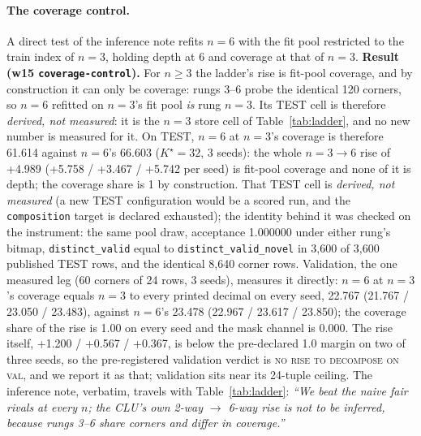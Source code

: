 \documentclass{article} %
\newcommand{\Kstar}{\ensuremath{K^{\star}}}
\begin{document}
\paragraph{The coverage control.} A direct test of the inference note refits $n=6$ with the
fit pool restricted to the train index of $n=3$, holding depth at 6 and coverage at that of $n=3$.
\textbf{Result (w15 \texttt{coverage-control}).} For $n\ge3$ the ladder's rise is fit-pool
coverage, and by construction it can only be coverage: rungs 3--6 probe the identical 120 corners, %
so $n=6$ refitted on $n=3$'s fit pool \emph{is} rung $n=3$. Its TEST cell is therefore
\emph{derived, not measured}: it is the $n=3$ store cell of Table~\ref{tab:ladder}, and no new
number is measured for it. %
On TEST, $n=6$ at $n=3$'s coverage is therefore 61.614 against $n=6$'s 66.603 ($\Kstar=32$, 3 seeds): %
the whole $n=3\to6$ rise of +4.989 (+5.758 / +3.467 / +5.742 per seed) is fit-pool coverage and %
none of it is depth; the coverage share is 1 by construction. That TEST cell is \emph{derived, not
measured} (a new TEST configuration would be a scored run, and the \texttt{composition} target is
declared exhausted); the identity behind it was checked on the instrument: the same pool draw,
acceptance 1.000000 under either rung's bitmap, \texttt{distinct\_valid} equal to %
\texttt{distinct\_valid\_novel} in 3,600 of 3,600 published TEST rows, and the identical 8,640 %
corner rows. Validation, the one measured leg (60 corners of 24 rows, 3 seeds), measures it %
directly: $n=6$ at $n=3$'s coverage equals $n=3$ to every printed decimal on every seed, 22.767 %
(21.767 / 23.050 / 23.483), against $n=6$'s 23.478 (22.967 / 23.617 / 23.850); the coverage %
share of the rise is 1.00 on every seed and the mask channel is 0.000. The rise itself, %
+1.200 / +0.567 / +0.367, is below the pre-declared 1.0 margin on two of three seeds, so the %
pre-registered validation verdict is \textsc{no rise to decompose on val}, and we report it as
that; validation sits near its 24-tuple ceiling. The inference note, verbatim, travels with %
Table~\ref{tab:ladder}: \emph{``We beat the naive fair rivals at every $n$; the CLU's own 2-way
$\to$ 6-way rise is not to be inferred, because rungs 3--6 share corners and differ in coverage.''}
\end{document}
